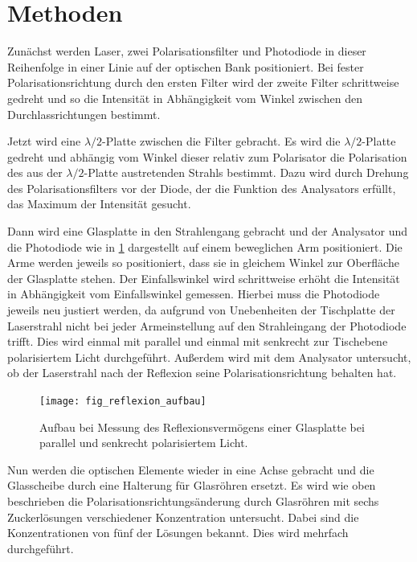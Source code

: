 \documentclass[
	a4paper,
	12pt,
	pagesize,
	ngerman
]{scrartcl}
\begin{document}
	\section{Methoden}
	Zunächst werden Laser, zwei Polarisationsfilter und Photodiode in dieser Reihenfolge in einer Linie auf der optischen Bank positioniert.
	Bei fester Polarisationsrichtung durch den ersten Filter wird der zweite Filter schrittweise gedreht und so die Intensität in Abhängigkeit vom Winkel zwischen den Durchlassrichtungen bestimmt.
	
	Jetzt wird eine $\lambda /2$-Platte zwischen die Filter gebracht.
	Es wird die $\lambda /2$-Platte gedreht und abhängig vom Winkel dieser relativ zum Polarisator die Polarisation des aus der $\lambda /2$-Platte austretenden Strahls bestimmt.
	Dazu wird durch Drehung des Polarisationsfilters vor der Diode, der die Funktion des Analysators erfüllt, das Maximum der Intensität gesucht.
	
	Dann wird eine Glasplatte in den Strahlengang gebracht und der Analysator und die Photodiode wie in \cref{fig_reflexion_aufbau} dargestellt auf einem beweglichen Arm positioniert.
	Die Arme werden jeweils so positioniert, dass sie in gleichem Winkel zur Oberfläche der Glasplatte stehen.
	Der Einfallswinkel wird schrittweise erhöht die Intensität in Abhängigkeit vom Einfallswinkel gemessen.
	Hierbei muss die Photodiode jeweils neu justiert werden, da aufgrund von Unebenheiten der Tischplatte der Laserstrahl nicht bei jeder Armeinstellung auf den Strahleingang der Photodiode trifft.
	Dies wird einmal mit parallel und einmal mit senkrecht zur Tischebene polarisiertem Licht durchgeführt.
	Außerdem wird mit dem Analysator untersucht, ob der Laserstrahl nach der Reflexion seine Polarisationsrichtung behalten hat.
	
	\begin{figure}[H] 
		\texttt{[image: fig\_reflexion\_aufbau]}
		\centering
		\caption{Aufbau bei Messung des Reflexionsvermögens einer Glasplatte bei parallel und senkrecht polarisiertem Licht. \cite{aufbau_reflexion}} 
		\label{fig_reflexion_aufbau}
		\centering
	\end{figure}
	
	Nun werden die optischen Elemente wieder in eine Achse gebracht und die Glasscheibe durch eine Halterung für Glasröhren ersetzt.
	Es wird wie oben beschrieben die Polarisationsrichtungsänderung durch Glasröhren mit sechs Zuckerlösungen verschiedener Konzentration untersucht.
	Dabei sind die Konzentrationen von fünf der Lösungen bekannt.
	Dies wird mehrfach durchgeführt.
	
\end{document}

